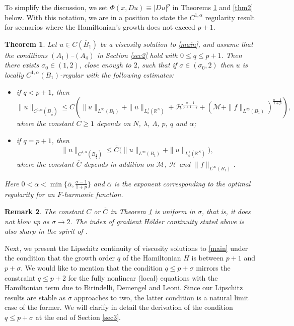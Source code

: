 \documentclass[11pt,reqno]{amsart}
\numberwithin{equation}{section}
\newtheorem{theorem}{Theorem}[section]
\newtheorem{remark}[theorem]{Remark}
\begin{document}
To simplify the discussion, we set $\Phi(x, Du) \equiv |Du|^p$ in Theorems \ref{thm1} and \ref{thm2} below. With this notation, we are in a position to state the $C^{1, \alpha}$ regularity result for scenarios where the Hamiltonian's growth does not exceed \(p+1\).

\begin{theorem}
\label{thm1}
Let $u\in C(\overline{B}_1)$ be a viscosity solution to \eqref{main}, and assume that the conditions $(A_1)$--$(A_4)$ in Section \ref{sec2} hold with $0\le q\le p+1$.
Then there exists $\sigma_0\in (1, 2)$, close enough to $2$, such that if $\sigma\in(\sigma_0, 2)$ then $u$ is locally $C^{1,\alpha}(B_1)$-regular with the following estimates:
\begin{itemize}
	\item [(i)] if $q< p+1$, then
	$$
	\|u\|_{C^{1,\alpha}(B_{\frac12})}\le C\left(\|u\|_{L^\infty(B_{1})}+\|u\|_{L^1_\sigma(\mathbb{R}^N)}+\mathcal{H}^\frac{\sigma-1}{p+1-q}+(\mathcal{M}+\|f\|_{L^\infty(B_{1})})
	^\frac{\sigma-1}{1+p}\right),
	$$
	where the constant $C\ge1$ depends on $N$, $\lambda$, $\Lambda$, $p$, $q$ and $\alpha$;
	
	\item [(ii)] if $q=p+1$, then
	$$
	\|u\|_{C^{1,\alpha}(B_{\frac12})}\le \overline{C}\bigl(\|u\|_{L^\infty(B_{1})}+\|u\|_{L^1_\sigma(\mathbb{R}^N)}\bigr),
	$$
	where the constant $\overline{C}$ depends in addition on $\mathcal{M}$, $\mathcal{H}$ and $\|f\|_{L^\infty(B_{1})}$.
\end{itemize}
Here $0<\alpha<\min\bigl\{\overline{\alpha},\frac{\sigma-1}{1+p}\bigr\}$
and $\overline{\alpha}$ is the exponent corresponding to the optimal regularity for an $F$-harmonic function.
\end{theorem}%

\begin{remark}
The constant $C$ or $\overline{C}$ in Theorem \ref{thm1} is uniform in $\sigma$, that is, it does not blow up as $\sigma\rightarrow2$. The index of gradient H\"{o}lder continuity stated above is also sharp in the spirit of \cite{AN25, ART15, PT21}.
\end{remark}

Next, we present the Lipschitz continuity of viscosity solutions to \eqref{main} under the condition that the growth order $q$ of the Hamiltonian $H$ is between $p+1$ and $p+\sigma$.
We would like to mention that the condition $q\le p+\sigma$ mirrors the constraint $q\le p+2$ for the fully nonlinear (local) equations with the Hamiltonian term %
due to Birindelli, Demengel and Leoni\cite{BDL19,BD16}. Since our Lipschitz results are stable as $\sigma$ approaches to two, the latter condition is a natural limit case of the former. We will clarify in detail the derivation of the condition $q\le p+\sigma$ at the end of Section \ref{sec3}.
\end{document}
